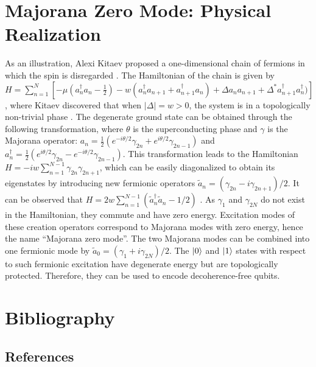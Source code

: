 \documentclass[11pt]{article}
\begin{document}
\section{Majorana Zero Mode: Physical Realization}
\label{sec:org89146da}
As an illustration, Alexi Kitaev proposed a one-dimensional chain of fermions in
which the spin is disregarded \cite{kitaevUnpairedMajoranaFermions2001}. The
Hamiltonian of the chain is given by \(H = \sum_{n=1}^{N} [- \mu
(a^{\dagger}_{n}a_{n}- \frac{1}{2}) - w (a^{\dagger}_{n}a_{n+1} +
a^{\dagger}_{n+1}a_{n}) + \Delta a_{n}a_{n+1} +
\Delta^{*}a^{\dagger}_{n+1}a^{\dagger}_{n})]\), where Kitaev discovered that
when \(|\Delta| = w > 0\), the system is in a topologically non-trivial
phase \cite{aliceaNewDirectionsPursuit2012}. The degenerate ground state can be
obtained through the following transformation, where \(\theta\) is the
superconducting phase and \(\gamma\) is the Majorana operator: \(a_{n} =
\frac{1}{2}(e^{-i \theta /2}\gamma_{2n} + e^{i\theta/2}\gamma_{2n-1})\) and
\(a^{\dagger}_{n} = \frac{1}{2}(e^{i\theta/2}\gamma_{2n} -
e^{-i\theta/2}\gamma_{2n-1})\). This transformation leads to the Hamiltonian \(H
= - i w \sum_{n=1}^{N-1}\gamma_{2n}\gamma_{2n+1}\), which can be easily
diagonalized to obtain its eigenstates by introducing new fermionic operators
\(\tilde{a}_{n} = (\gamma_{2n}-i\gamma_{2n+1})/2\). It can be observed that \(H
= 2w \sum_{n=1}^{N-1}(\tilde{a}^{\dagger}_{n}\tilde{a}_{n}
-1/2)\) \cite{huangIntroductionMajoranaZero2021}. As \(\gamma_1\) and \(\gamma_{2N}\)
do not exist in the Hamiltonian, they commute and have zero energy. Excitation
modes of these creation operators correspond to Majorana modes with zero energy,
hence the name ``Majorana zero mode''. The two Majorana modes can be combined into
one fermionic mode by \(\tilde{a}_0 = (\gamma_1 + i \gamma_{2N}) /2\). The
\(\ket{0}\) and \(\ket{1}\) states with respect to such fermionic excitation have
degenerate energy but are topologically protected. Therefore, they can be used
to encode decoherence-free qubits.

\section{Bibliography}
\label{sec:org456ef45}
\subsection{References}
\label{sec:orgfa8b0e2}


\end{document}
